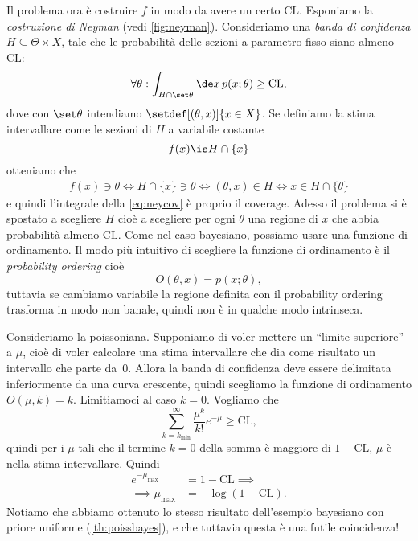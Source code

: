 Il problema ora è costruire $f$ in modo da avere un certo $\mathrm{CL}$.
Esponiamo la \emph{costruzione di Neyman} (vedi \autoref{fig:neyman}).
Consideriamo una \emph{banda di confidenza} $H\subseteq \Theta\times X$,
tale che le probabilità delle sezioni a parametro fisso siano almeno $\mathrm{CL}$:
\begin{equation}
	\label{eq:neycov}
	\forall\theta:
	\int_{H\cap\set\theta} \de x\, p(x;\theta) \ge \mathrm{CL},
\end{equation}
dove con $\set\theta$ intendiamo $\setdef[(\theta,x)]{x\in X}$.
Se definiamo la stima intervallare come le sezioni di $H$ a variabile costante
\begin{equation*}
	f(x) \is H \cap \{x\}
\end{equation*}
otteniamo che
\begin{align*}
	f(x)\ni\theta
	\iff
	H \cap \{x\} \ni \theta
	\iff
	(\theta,x) \in H
	\iff
	x \in H \cap \{\theta\}
\end{align*}
e quindi l'integrale della \eqref{eq:neycov} è proprio il coverage.
Adesso il problema si è spostato a scegliere $H$
cioè a scegliere per ogni $\theta$ una regione di $x$ che abbia probabilità almeno $\mathrm{CL}$.
Come nel caso bayesiano, possiamo usare una funzione di ordinamento.
Il modo più intuitivo di scegliere la funzione di ordinamento è il \emph{probability ordering} cioè
\begin{equation*}
	O(\theta,x) = p(x;\theta),
\end{equation*}
tuttavia se cambiamo variabile la regione definita con il probability ordering trasforma in modo non banale,
quindi non è in qualche modo intrinseca.

\begin{example}
	\label{th:poisssup}
	Consideriamo la poissoniana.
	Supponiamo di voler mettere un ``limite superiore'' a $\mu$,
	cioè di voler calcolare una stima intervallare che dia come risultato un intervallo che parte da~0.
	Allora la banda di confidenza deve essere delimitata inferiormente da una curva crescente,
	quindi scegliamo la funzione di ordinamento $O(\mu,k)=k$.
	Limitiamoci al caso $k=0$.
	Vogliamo che
	\begin{equation*}
		\sum_{k=k_\mathrm{min}}^\infty \frac{\mu^k}{k!}e^{-\mu} \ge \mathrm{CL},
	\end{equation*}
	quindi per i $\mu$ tali che il termine $k=0$ della somma è maggiore di $1-\mathrm{CL}$,
	$\mu$ è nella stima intervallare.
	Quindi
	\begin{align*}
		e^{-\mu_\mathrm{max}}
		&= 1 - \mathrm{CL} \implies \\
		\implies \mu_\mathrm{\max}
		&= -\log(1-\mathrm{CL}).
	\end{align*}
	Notiamo che abbiamo ottenuto lo stesso risultato dell'esempio bayesiano con priore uniforme (\autoref{th:poissbayes}),
	e che tuttavia questa è una futile coincidenza!
\end{example}


